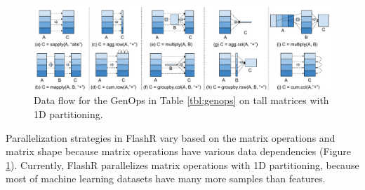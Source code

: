 \begin{figure}
	\centering
	\includegraphics[scale=0.5]{FlashMatrix_figs/Parallelize.pdf}
	\vspace{-4pt}
	\caption{Data flow for the GenOps in Table \ref{tbl:genops} on tall matrices
	 with 1D partitioning.}
	\label{fig:parallel}
  \vspace{-8pt}
\end{figure}

Parallelization strategies in FlashR vary based on the matrix operations
and matrix shape because matrix operations have various data dependencies
(Figure \ref{fig:parallel}). Currently, FlashR parallelizes matrix operations
with 1D partitioning, because most of machine learning datasets have many more
samples than features.

